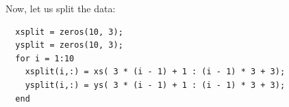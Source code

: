 \documentclass[10pt]{article}
\begin{document}
\begin{itemize}
  \color{black}
  Now, let us split the data:
  \begin{verbatim}
  xsplit = zeros(10, 3);
  ysplit = zeros(10, 3);
  for i = 1:10
    xsplit(i,:) = xs( 3 * (i - 1) + 1 : (i - 1) * 3 + 3);
    ysplit(i,:) = ys( 3 * (i - 1) + 1 : (i - 1) * 3 + 3);
  end
  \end{verbatim}
\end{itemize}
\end{document}
